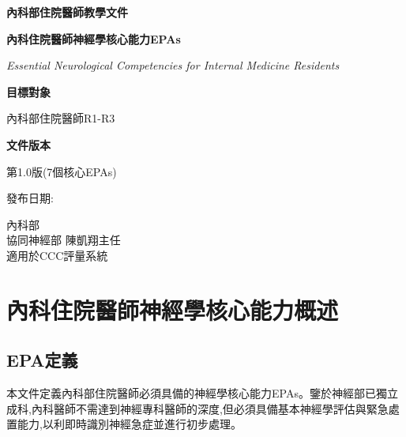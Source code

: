 \documentclass[12pt,a4paper]{article}
\newcommand{\mydate}{\DTMtoday}
\begin{document}
\begin{titlepage}
    \centering
    {\LARGE\textcolor{neuro_blue}{\textbf{內科部住院醫師教學文件}}\par}
    \vspace{1cm}
    {\huge\bfseries 內科住院醫師神經學核心能力EPAs\par}
    \vspace{0.5cm}
    {\Large\textcolor{neuro_silver}{\textit{Essential Neurological Competencies for Internal Medicine Residents}}\par}
    \vspace{1cm}
    
    \begin{tcolorbox}[
        colback=neuro_silver!5!white,
        colframe=neuro_silver,
        width=0.8\textwidth,
        arc=10pt,
        boxrule=1pt
    ]
    \centering
    {\large\textbf{目標對象}\par}
    \vspace{0.3cm}
    內科部住院醫師R1-R3\par
    \vspace{0.5cm}
    {\large\textbf{文件版本}\par}
    \vspace{0.3cm}
    第1.0版(7個核心EPAs)\par
    發布日期:\mydate\par
    \end{tcolorbox}

    \vfill
    
    {\large 內科部 \\
    協同神經部 陳凱翔主任\\
    適用於CCC評量系統\par}
    
    \vspace{0.5cm}
\end{titlepage}

\newpage
\tableofcontents
\newpage

\section{內科住院醫師神經學核心能力概述}

\subsection{EPA定義}
本文件定義內科部住院醫師必須具備的神經學核心能力EPAs。鑒於神經部已獨立成科,內科醫師不需達到神經專科醫師的深度,但必須具備基本神經學評估與緊急處置能力,以利即時識別神經急症並進行初步處理。
\end{document}
